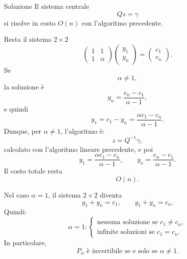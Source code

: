 \documentclass[a4paper]{article}
\begin{document}
\begin{snippetsolution}{Soluzione}
    Il sistema centrale
    \[
        Qz=\gamma
    \]
    si risolve in costo \(O(n)\) con l'algoritmo precedente.

    Resta il sistema \(2\times 2\)
    \[
        \begin{pmatrix}
            1 & 1\\
            1 & \alpha
        \end{pmatrix}
        \begin{pmatrix}
            y_1\\
            y_n
        \end{pmatrix}
        =
        \begin{pmatrix}
            c_1\\
            c_n
        \end{pmatrix}.
    \]
    Se
    \[
        \alpha\neq 1,
    \]
    la soluzione è
    \[
        y_n=\frac{c_n-c_1}{\alpha-1},
    \]
    e quindi
    \[
        y_1=c_1-y_n
        =
        \frac{\alpha c_1-c_n}{\alpha-1}.
    \]
    Dunque, per \(\alpha\neq 1\), l'algoritmo è:
    \[
        z=Q^{-1}\gamma,
    \]
    calcolato con l'algoritmo lineare precedente, e poi
    \[
        y_1=\frac{\alpha c_1-c_n}{\alpha-1},
        \qquad
        y_n=\frac{c_n-c_1}{\alpha-1}.
    \]
    Il costo totale resta
    \[
        \boxed{
            O(n).
        }
    \]

    Nel caso \(\alpha=1\), il sistema \(2\times 2\) diventa
    \[
        y_1+y_n=c_1,
        \qquad
        y_1+y_n=c_n.
    \]
    Quindi:
    \[
        \alpha=1:
        \begin{cases}
            \text{nessuna soluzione se } c_1\neq c_n,\\
            \text{infinite soluzioni se } c_1=c_n.
        \end{cases}
    \]
    In particolare,
    \[
        \boxed{
            P_\alpha \text{ è invertibile se e solo se } \alpha\neq 1.
        }
    \]
\end{snippetsolution}
\end{document}
